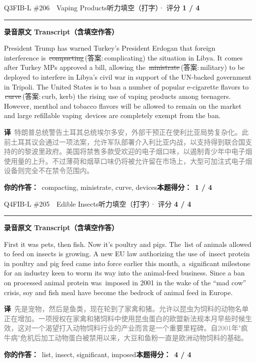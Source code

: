 \documentclass[11pt]{article}
\newcommand{\ptesub}[1]{%
  \par\needspace{2\baselineskip}\smallskip
  {\color{cAccent}\rule[-0.2ex]{3pt}{1.05em}}\hspace{6pt}%
  {\bfseries\color{cHead}#1}\par\nopagebreak\smallskip}
\newcommand{\zh}[1]{{\footnotesize\textcolor{cNote}{\textbf{译}}\ \textcolor{gray}{#1}}}
\newcommand{\rok}[1]{{\color{cFix}\ding{51}\,#1}}                 %
\newcommand{\rno}[2]{{\color{cWrong}\ding{55}\,\sout{#1}}\,{\footnotesize\color{cFix}(答案:\,#2)}}  %
\begin{document}
\begin{qblock}{Q3\quad FIB-L \#206\ \ Vaping Products}{听力填空（打字）· 评分 \textcolor{cAccent}{\bfseries 1 / 4}}
\ptesub{录音原文 Transcript（含填空作答）}
\begin{promptbox}
President Trump has warned Turkey's President Erdogan that foreign interference is \rno{compacting}{complicating} the situation in Libya. It comes after Turkey MPs approved a bill, allowing the \rno{ministrate}{military} to be deployed to interfere in Libya's civil war in support of the UN-backed government in Tripoli. The United States is to ban a number of popular e-cigarette flavors to \rno{curve}{curb, kerb} the rising use of vaping products among teenagers. However, menthol and tobacco flavors will be allowed to remain on the market and large refillable vaping \rok{devices} are completely exempt from the ban.
\end{promptbox}
\zh{特朗普总统警告土耳其总统埃尔多安，外部干预正在使利比亚局势复杂化。此前土耳其议会通过一项法案，允许军队部署介入利比亚内战，以支持得到联合国支持的的黎波里政府。美国将禁售多款受欢迎的电子烟口味，以遏制青少年中电子烟使用量的上升。不过薄荷和烟草口味仍将被允许留在市场上，大型可加注式电子烟设备则完全不在禁令范围内。}
\par\smallskip
\textbf{你的作答：}\ {\color{cWrong}compacting, ministrate, curve}, devices\qquad\textbf{本题得分：}\ {\color{cAccent}\bfseries 1 / 4}
\end{qblock}

\begin{qblock}{Q4\quad FIB-L \#205\ \ Edible Insects}{听力填空（打字）· 评分 \textcolor{cAccent}{\bfseries 4 / 4}}
\ptesub{录音原文 Transcript（含填空作答）}
\begin{promptbox}
First it was pets, then fish. Now it's poultry and pigs. The \rok{list} of animals allowed to feed on insects is growing. A new EU law authorizing the use of \rok{insect} protein in poultry and pig feed came into force earlier this month, a \rok{significant} milestone for an industry keen to worm its way into the animal-feed business. Since a ban on processed animal protein was \rok{imposed} in 2001 in the wake of the ``mad cow'' crisis, soy and fish meal have become the bedrock of animal feed in Europe.
\end{promptbox}
\zh{先是宠物，然后是鱼类，现在轮到了家禽和猪。允许以昆虫为饲料的动物名单正在增加。一项授权在家禽和猪饲料中使用昆虫蛋白的欧盟新法规本月早些时候生效，这对一个渴望打入动物饲料行业的产业而言是一个重要里程碑。自2001年"疯牛病"危机后加工动物蛋白被禁用以来，大豆和鱼粉一直是欧洲动物饲料的基础。}
\par\smallskip
\textbf{你的作答：}\ list, insect, significant, imposed\qquad\textbf{本题得分：}\ {\color{cAccent}\bfseries 4 / 4}
\end{qblock}
\end{document}
